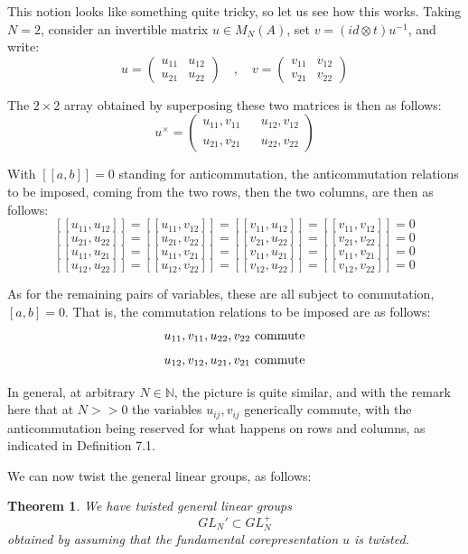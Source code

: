 \documentclass[12pt]{amsbook}
\newtheorem{theorem}{Theorem}[chapter]
\begin{document}
This notion looks like something quite tricky, so let us see how this works. Taking $N=2$, consider an invertible matrix $u\in M_N(A)$, set $v=(id\otimes t)u^{-1}$, and write:
$$u=\begin{pmatrix}u_{11}&u_{12}\\ u_{21}&u_{22}\end{pmatrix}
\quad,\quad 
v=\begin{pmatrix}v_{11}&v_{12}\\ v_{21}&v_{22}\end{pmatrix}$$

The $2\times2$ array obtained by superposing these two matrices is then as follows:
$$u^\times=\begin{pmatrix}u_{11},v_{11}&&u_{12},v_{12}\\ \\u_{21},v_{21}&&u_{22},v_{22}\end{pmatrix}$$

With $[[a,b]]=0$ standing for anticommutation, the anticommutation relations to be imposed, coming from the two rows, then the two columns, are then as follows:
$$[[u_{11},u_{12}]]=[[u_{11},v_{12}]]=[[v_{11},u_{12}]]=[[v_{11},v_{12}]]=0$$
$$[[u_{21},u_{22}]]=[[u_{21},v_{22}]]=[[v_{21},u_{22}]]=[[v_{21},v_{22}]]=0$$
$$[[u_{11},u_{21}]]=[[u_{11},v_{21}]]=[[v_{11},u_{21}]]=[[v_{11},v_{21}]]=0$$
$$[[u_{12},u_{22}]]=[[u_{12},v_{22}]]=[[v_{12},u_{22}]]=[[v_{12},v_{22}]]=0$$

As for the remaining pairs of variables, these are all subject to commutation, $[a,b]=0$. That is, the commutation relations to be imposed are as follows:
$$u_{11},v_{11},u_{22},v_{22}\ {\rm commute}$$
$$u_{12},v_{12},u_{21},v_{21}\ {\rm commute}$$

In general, at arbitrary $N\in\mathbb N$, the picture is quite similar, and with the remark here that at $N>>0$ the variables $u_{ij},v_{ij}$ generically commute, with the anticommutation being reserved for what happens on rows and columns, as indicated in Definition 7.1.

\bigskip

We can now twist the general linear groups, as follows:


\begin{theorem}
We have twisted general linear groups
$$GL_N'\subset GL_N^+$$
obtained by assuming that the fundamental corepresentation $u$ is twisted.
\end{theorem}
\end{document}
